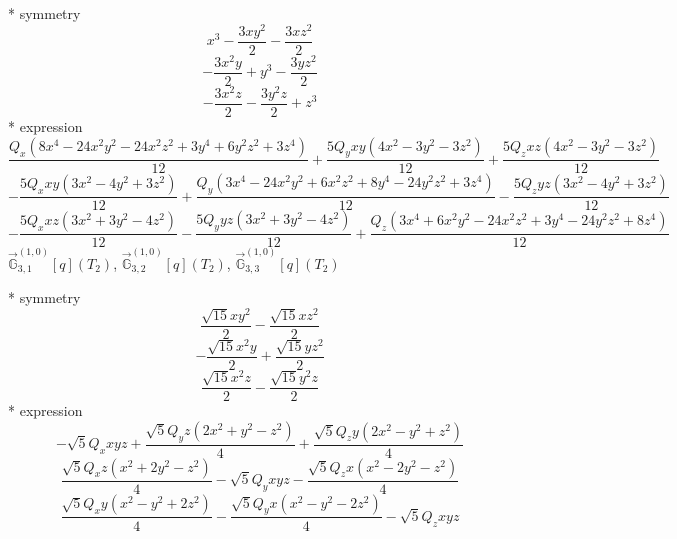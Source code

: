 \documentclass[fleqn,8pt]{jsarticle}
\begin{document}
\noindent\quad ** symmetry
\begin{dmath*}
x^{3} - \frac{3 x y^{2}}{2} - \frac{3 x z^{2}}{2}
\end{dmath*}
\begin{dmath*}
- \frac{3 x^{2} y}{2} + y^{3} - \frac{3 y z^{2}}{2}
\end{dmath*}
\begin{dmath*}
- \frac{3 x^{2} z}{2} - \frac{3 y^{2} z}{2} + z^{3}
\end{dmath*}
\noindent\quad ** expression
\begin{dmath*}
\frac{Q_{x} \left(8 x^{4} - 24 x^{2} y^{2} - 24 x^{2} z^{2} + 3 y^{4} + 6 y^{2} z^{2} + 3 z^{4}\right)}{12} + \frac{5 Q_{y} x y \left(4 x^{2} - 3 y^{2} - 3 z^{2}\right)}{12} + \frac{5 Q_{z} x z \left(4 x^{2} - 3 y^{2} - 3 z^{2}\right)}{12}
\end{dmath*}
\begin{dmath*}
- \frac{5 Q_{x} x y \left(3 x^{2} - 4 y^{2} + 3 z^{2}\right)}{12} + \frac{Q_{y} \left(3 x^{4} - 24 x^{2} y^{2} + 6 x^{2} z^{2} + 8 y^{4} - 24 y^{2} z^{2} + 3 z^{4}\right)}{12} - \frac{5 Q_{z} y z \left(3 x^{2} - 4 y^{2} + 3 z^{2}\right)}{12}
\end{dmath*}
\begin{dmath*}
- \frac{5 Q_{x} x z \left(3 x^{2} + 3 y^{2} - 4 z^{2}\right)}{12} - \frac{5 Q_{y} y z \left(3 x^{2} + 3 y^{2} - 4 z^{2}\right)}{12} + \frac{Q_{z} \left(3 x^{4} + 6 x^{2} y^{2} - 24 x^{2} z^{2} + 3 y^{4} - 24 y^{2} z^{2} + 8 z^{4}\right)}{12}
\end{dmath*}
\noindent\quad $\vec{\mathbb{G}}_{3,1}^{(1,0)}[q](T_{2})$, $\vec{\mathbb{G}}_{3,2}^{(1,0)}[q](T_{2})$, $\vec{\mathbb{G}}_{3,3}^{(1,0)}[q](T_{2})$

\noindent\quad ** symmetry
\begin{dmath*}
\frac{\sqrt{15} x y^{2}}{2} - \frac{\sqrt{15} x z^{2}}{2}
\end{dmath*}
\begin{dmath*}
- \frac{\sqrt{15} x^{2} y}{2} + \frac{\sqrt{15} y z^{2}}{2}
\end{dmath*}
\begin{dmath*}
\frac{\sqrt{15} x^{2} z}{2} - \frac{\sqrt{15} y^{2} z}{2}
\end{dmath*}
\noindent\quad ** expression
\begin{dmath*}
- \sqrt{5} Q_{x} x y z + \frac{\sqrt{5} Q_{y} z \left(2 x^{2} + y^{2} - z^{2}\right)}{4} + \frac{\sqrt{5} Q_{z} y \left(2 x^{2} - y^{2} + z^{2}\right)}{4}
\end{dmath*}
\begin{dmath*}
\frac{\sqrt{5} Q_{x} z \left(x^{2} + 2 y^{2} - z^{2}\right)}{4} - \sqrt{5} Q_{y} x y z - \frac{\sqrt{5} Q_{z} x \left(x^{2} - 2 y^{2} - z^{2}\right)}{4}
\end{dmath*}
\begin{dmath*}
\frac{\sqrt{5} Q_{x} y \left(x^{2} - y^{2} + 2 z^{2}\right)}{4} - \frac{\sqrt{5} Q_{y} x \left(x^{2} - y^{2} - 2 z^{2}\right)}{4} - \sqrt{5} Q_{z} x y z
\end{dmath*}
\end{document}

